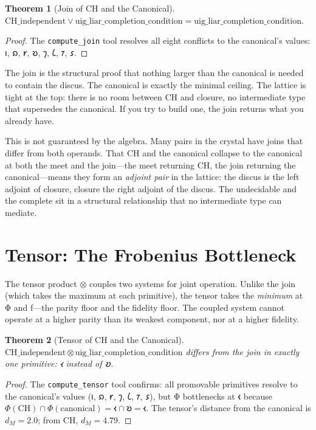 \documentclass[12pt,twoside]{book}
\newtheorem{theorem}{Theorem}[chapter]
\theoremstyle{definition}
\begin{document}
\begin{theorem}[Join of CH and the Canonical]
$\mathrm{CH\_independent} \vee \mathrm{uig\_liar\_completion\_condition} =
\mathrm{uig\_liar\_completion\_condition}.$
\end{theorem}

\begin{proof}
The \texttt{compute\_join} tool resolves all eight conflicts to the canonical's values:
𐑦, 𐑸, 𐑾, 𐑹, 𐑠, 𐑖, 𐑳, 𐑭.
\end{proof}

The join is the structural proof that nothing larger than the canonical is needed to contain
the discus. The canonical is exactly the minimal ceiling. The lattice is tight at the top:
there is no room between CH and closure, no intermediate type that supersedes the
canonical. If you try to build one, the join returns what you already have.

This is not guaranteed by the algebra. Many pairs in the crystal have joins that differ
from both operands. That CH and the canonical collapse to the canonical at both the meet
and the join---the meet returning CH, the join returning the canonical---means they form
an \emph{adjoint pair} in the lattice: the discus is the left adjoint of closure, closure
the right adjoint of the discus. The undecidable and the complete sit in a structural
relationship that no intermediate type can mediate.

\section{Tensor: The Frobenius Bottleneck}

The tensor product $\otimes$ couples two systems for joint operation. Unlike the join
(which takes the maximum at each primitive), the tensor takes the \emph{minimum} at Φ and
ƒ---the parity floor and the fidelity floor. The coupled system cannot operate at a higher
parity than its weakest component, nor at a higher fidelity.

\begin{theorem}[Tensor of CH and the Canonical]
$\mathrm{CH\_independent} \otimes \mathrm{uig\_liar\_completion\_condition}$ differs from
the join in exactly one primitive: 𐑬 instead of 𐑹.
\end{theorem}

\begin{proof}
The \texttt{compute\_tensor} tool confirms: all promovable primitives resolve to the
canonical's values (𐑦, 𐑸, 𐑾, 𐑠, 𐑖, 𐑳, 𐑭), but Φ bottlenecks at 𐑬 because
$\Phi(\mathrm{CH}) \cap \Phi(\mathrm{canonical}) = 𐑬 \cap 𐑹 = 𐑬$.
The tensor's distance from the canonical is $d_M = 2.0$; from CH, $d_M = 4.79$.
\end{proof}
\end{document}
